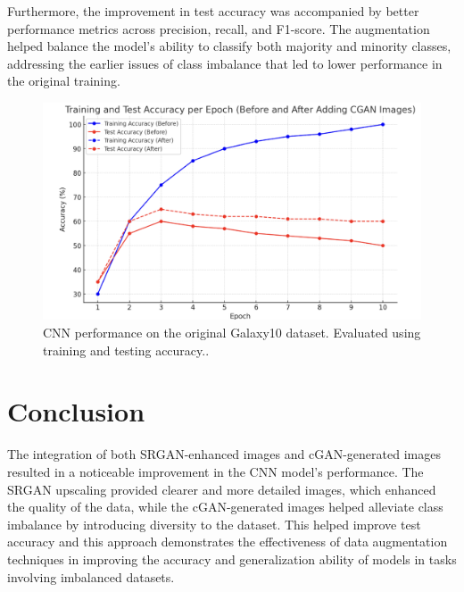 \documentclass[10pt,twocolumn,letterpaper]{article}
\begin{document}
Furthermore, the improvement in test accuracy was accompanied by better performance metrics across precision, recall, and F1-score. The augmentation helped balance the model's ability to classify both majority and minority classes, addressing the earlier issues of class imbalance that led to lower performance in the original training.
\begin{figure}[htbp]
  \includegraphics[width=\linewidth]{accuracy_after.png}
  \caption{CNN performance on the original Galaxy10 dataset. Evaluated using training and testing accuracy..}
  \label{fig:galaxysrgan}
\end{figure}


\section{Conclusion}
The integration of both SRGAN-enhanced images and cGAN-generated images resulted in a noticeable improvement in the CNN model’s performance. The SRGAN upscaling provided clearer and more detailed images, which enhanced the quality of the data, while the cGAN-generated images helped alleviate class imbalance by introducing diversity to the dataset. This helped improve test accuracy and this approach demonstrates the effectiveness of data augmentation techniques in improving the accuracy and generalization ability of models in tasks involving imbalanced datasets.
{
    \small
    \nocite{*}
    
    
}
\end{document}

